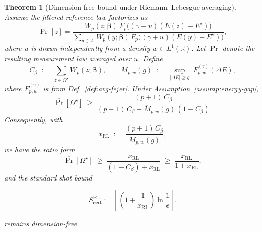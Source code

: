 \documentclass[a4paper,unpublished,onecolumn,11pt]{quantumarticle}
\newtheorem{theorem}{Theorem}
\theoremstyle{definition}
\theoremstyle{remark}
\begin{document}
\begin{theorem}[Dimension-free bound under Riemann--Lebesgue averaging]
\label{thm:rl-dimension-free}
Assume the filtered reference law factorizes as
\[
\Pr[z]
=
\frac{W_p(z;\boldsymbol\beta)\,F_p\bigl((\gamma+u)(E(z)-E^\star)\bigr)}
{\sum_{y\in\mathcal X}W_p(y;\boldsymbol\beta)\,F_p\bigl((\gamma+u)(E(y)-E^\star)\bigr)},
\]
where $u$ is drawn independently from a density $w\in L^1(\mathbb R)$.
Let $\overline{\Pr}$ denote the resulting measurement law averaged over $u$.
Define
\[
C_\beta \;:=\; \sum_{z\in\Omega^\star} W_p(z;\boldsymbol\beta),
\qquad
\overline M_{p,w}(g) \;:=\; \sup_{|\Delta E|\ge g}\ \overline F_{p,w}^{(\gamma)}(\Delta E),
\]
where $\overline F_{p,w}^{(\gamma)}$ is from Def.~\ref{def:avg-fejer}.
Under Assumption~\ref{assump:energy-gap},
\begin{equation}
\label{eq:rl-success}
\overline{\Pr}[\Omega^\star]
\;\ge\;
\frac{(p+1)\,C_\beta}{(p+1)\,C_\beta+\overline M_{p,w}(g)\,(1-C_\beta)}.
\end{equation}
Consequently, with
\[
x_{\mathrm{RL}}
\;:=\;
\frac{(p+1)\,C_\beta}{\overline M_{p,w}(g)},
\]
we have the ratio form
\[
\overline{\Pr}[\Omega^\star]
\;\ge\;
\frac{x_{\mathrm{RL}}}{(1-C_\beta)+x_{\mathrm{RL}}}
\;\ge\;
\frac{x_{\mathrm{RL}}}{1+x_{\mathrm{RL}}},
\]
and the standard shot bound

\[
S_{\mathrm{cert}}^{\mathrm{RL}}
:=
\left\lceil
\left(1+\frac{1}{x_{\mathrm{RL}}}\right)
\ln\frac{1}{\epsilon}
\right\rceil.
\]

remains dimension-free.
\end{theorem}



\end{document}
